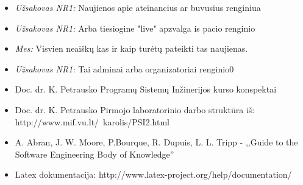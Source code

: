 \documentclass{VUMIFPSkursinis}
\begin{document}
\begin{itemize}
\begin{itemize}
					\item \textit{Užsakovas NR1:} Naujienos apie ateinancius ar buvusius renginiua
					\item \textit{Užsakovas NR1:} Arba tiesiogine "live" apzvalga is pacio renginio
					\item \textit{Mes:} Visvien neaiškų kas ir kaip turėtų pateikti tas naujienas.
					\item \textit{Užsakovas NR1:} Tai adminai arba organizatoriai renginio0
				\end{itemize}
        \end{itemize}
     \label{literaturosSarasas}
        \begin{itemize}
			\item Doc. dr. K. Petrausko Programų Sistemų Inžinerijos kurso konspektai
			\item Doc. dr. K. Petrausko Pirmojo laboratorinio darbo struktūra iš: http://www.mif.vu.lt/~karolis/PSI2.html
			\item A. Abran, J. W. Moore, P.Bourque, R. Dupuis, L. L. Tripp - ,,Guide to the Software Engineering Body of Knowledge''
			\item Latex dokumentacija: http://www.latex-project.org/help/documentation/
        \end{itemize}
\end{document}
